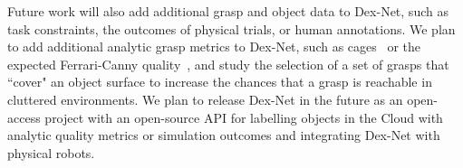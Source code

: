 Future work will also add additional grasp and object data to Dex-Net, such as task constraints, the outcomes of physical trials, or human annotations.
We plan to add additional analytic grasp metrics to Dex-Net, such as cages~\cite{diankov2010automated} or the expected Ferrari-Canny quality~\cite{kim2012physically}, and study the selection of a set of grasps that ``cover" an object surface to increase the chances that a grasp is reachable in cluttered environments.
We plan to release Dex-Net in the future as an open-access project with an open-source API for labelling objects in the Cloud with analytic quality metrics or simulation outcomes and integrating Dex-Net with physical robots.

